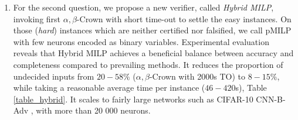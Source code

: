 \begin{enumerate}
	
	\item For the second question, we propose a new verifier, called {\em Hybrid MILP}, invoking first 	$\alpha,\beta$-Crown with short time-out to settle the easy instances. On those ({\em hard}) instances which are neither certified nor falsified, we call pMILP with few neurons encoded as binary variables. Experimental evaluation reveals that Hybrid MILP achieves a beneficial balance between accuracy and completeness compared to prevailing methods. It reduces the proportion of undecided inputs from $20-58\%$ ($\alpha,\beta$-Crown with 2000s TO) to $8-15\%$, while taking a reasonable average time per instance ($46-420$s), Table \ref{table_hybrid}. It scales to fairly large networks such as CIFAR-10 CNN-B-Adv \cite{SDPFI}, with more than 20 000 neurons.
\end{enumerate}

